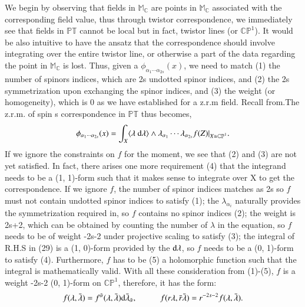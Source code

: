 \documentclass{article}
\begin{document}
 We begin by observing that fields in $\mathbb{M_{C}}$ are points in
 $\mathbb{M_{C}}$ associated with the corresponding field value, thus through
 twistor correspondence, we immediately see that fields in $\mathbb{PT}$
 cannot be local but in fact, twistor lines (or $\mathbb{CP}^{1}$).
 It would be also intuitive to have the ansatz that the
 correspondence should involve integrating over the entire twistor
 line, or otherwise a part of the data regarding the point in
 $\mathbb{M_{C}}$ is lost. Thus, given a $\phi_{\alpha_1 \cdots
 \alpha_{2s}}(x)$, we need to match (1) the number of spinors
 indices, which are 2s undotted spinor indices, 
 and (2) the 2s symmetrization upon exchanging the
 spinor indices, and (3) the weight (or homogeneity), which is 0 as we have
 established for a z.r.m field. Recall from.The z.r.m. of spin s correspondence in $\mathbb{PT}$ thus becomes, 
 \begin{align}
  \label{spin s z.r.m. field}
   \phi_{\alpha_1 \cdots \alpha_{2s}}(x) = \int_{X} \langle
   \lambda
   \textnormal{ d}\lambda \rangle \wedge \lambda_{\alpha_1} \cdots
   \lambda_{\alpha_{2s}} f(Z) |_{X \cong \mathbb{CP}^{1}}.
 \end{align} 
 If we ignore the constraints on $f$ for the moment, 
 we see that (2) and (3) are not yet satisfied. In fact, there arises one
 more requirement (4) that the integrand needs to be a (1, 1)-form such
 that it makes sense to integrate over X to get the
 correspondence. If we ignore $f$, the number of spinor indices matches as
 2s so $f$ must not contain undotted spinor indices to satisfy (1); the $\lambda_{\alpha_{i}}$ naturally
 provides the symmetrization required in, so $f$ contains no spinor
 indices (2); the weight is 
 2s+2, which can be obtained by counting the number of $\lambda$
 in the equation, so $f$ needs to be of weight -2s-2 under projective
 scaling to satisfy (3); 
 the integral of R.H.S in (29) is a (1, 0)-form provided by the
 $\textnormal{d} \lambda$, so $f$ needs to be a (0, 1)-form to satisfy
 (4). Furthermore, $f$ has to be (5) a holomorphic function such that the
 integral is mathematically valid. 
 With all these consideration from (1)-(5), $f$ is a weight -2s-2 (0,
 1)-form on $\mathbb{CP}^{1}$, therefore, it has the form: 
 \begin{align}
  \label{z.r.m. cohomology representation}
   f(\lambda, \bar \lambda) = f^{\bar \alpha}(\lambda, \bar \lambda)
   \textnormal{d} \bar \lambda_{\bar \alpha}, \hspace{1cm}
   f(r\lambda, \bar r \bar \lambda) = r^{-2s-2} f( \lambda, \bar \lambda ).
 \end{align}
\end{document}
